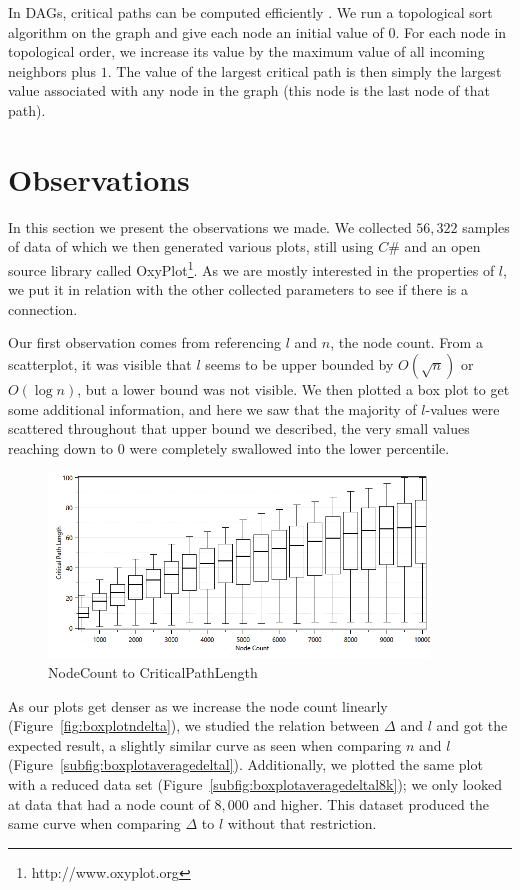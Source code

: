 In DAGs, critical paths can be computed efficiently \cite[p. 661-666]{sedgewick2011algorithms}. We run a topological sort algorithm on the graph and give each node an initial value of $0$. For each node in topological order, we increase its value by the maximum value of all incoming neighbors plus $1$. The value of the largest critical path is then simply the largest value associated with any node in the graph (this node is the last node of that path).

\section{Observations}

In this section we present the observations we made. We collected $56,322$ samples of data of which we then generated various plots, still using $C\#$ and an open source library called OxyPlot\footnote{http://www.oxyplot.org}. As we are mostly interested in the properties of $l$, we put it in relation with the other collected parameters to see if there is a connection.

Our first observation comes from referencing $l$ and $n$, the node count. From a scatterplot, it was visible that $l$ seems to be upper bounded by $O(\sqrt{n})$ or $O(\log n)$, but a lower bound was not visible. We then plotted a box plot to get some additional information, and here we saw that the majority of $l$-values were scattered throughout that upper bound we described, the very small values reaching down to $0$ were completely swallowed into the lower percentile.

\begin{figure}[ht]
	\centering
		\includegraphics[width=0.9\textwidth]{figures/plots/boxplotnl.png}
	\caption{NodeCount to CriticalPathLength}
	\label{fig:scatterplotnl}
\end{figure}

As our plots get denser as we increase the node count linearly (Figure~\ref{fig:boxplotndelta}), we studied the relation between $\Delta$ and $l$ and got the expected result, a slightly similar curve as seen when comparing $n$ and $l$ (Figure~\ref{subfig:boxplotaveragedeltal}). Additionally, we plotted the same plot with a reduced data set (Figure~\ref{subfig:boxplotaveragedeltal8k}); we only looked at data that had a node count of $8,000$ and higher. This dataset produced the same curve when comparing $\Delta$ to $l$ without that restriction.

